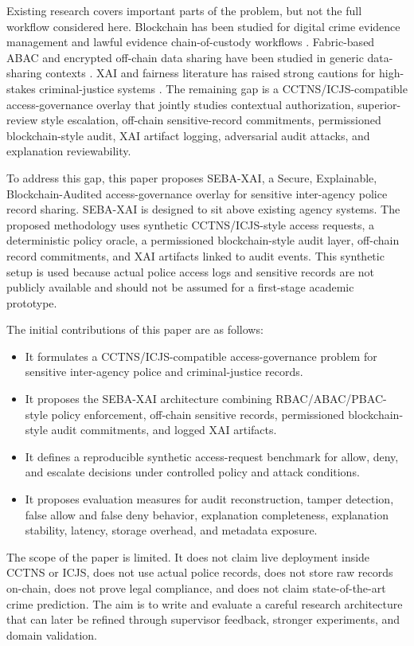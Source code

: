 Existing research covers important parts of the problem, but not the full workflow considered here. Blockchain has been studied for digital crime evidence management and lawful evidence chain-of-custody workflows \cite{kim_two_level_2021,li_lechain_2021}. Fabric-based ABAC and encrypted off-chain data sharing have been studied in generic data-sharing contexts \cite{zhao_fabric_abac_2022}. XAI and fairness literature has raised strong cautions for high-stakes criminal-justice systems \cite{rudin_2019,ensign_feedback_2018,zocholl_xai_law_enforcement_2025}. The remaining gap is a CCTNS/ICJS-compatible access-governance overlay that jointly studies contextual authorization, superior-review style escalation, off-chain sensitive-record commitments, permissioned blockchain-style audit, XAI artifact logging, adversarial audit attacks, and explanation reviewability.

To address this gap, this paper proposes SEBA-XAI, a Secure, Explainable, Blockchain-Audited access-governance overlay for sensitive inter-agency police record sharing. SEBA-XAI is designed to sit above existing agency systems. The proposed methodology uses synthetic CCTNS/ICJS-style access requests, a deterministic policy oracle, a permissioned blockchain-style audit layer, off-chain record commitments, and XAI artifacts linked to audit events. This synthetic setup is used because actual police access logs and sensitive records are not publicly available and should not be assumed for a first-stage academic prototype.

The initial contributions of this paper are as follows:
\begin{itemize}
    \item It formulates a CCTNS/ICJS-compatible access-governance problem for sensitive inter-agency police and criminal-justice records.
    \item It proposes the SEBA-XAI architecture combining RBAC/ABAC/PBAC-style policy enforcement, off-chain sensitive records, permissioned blockchain-style audit commitments, and logged XAI artifacts.
    \item It defines a reproducible synthetic access-request benchmark for allow, deny, and escalate decisions under controlled policy and attack conditions.
    \item It proposes evaluation measures for audit reconstruction, tamper detection, false allow and false deny behavior, explanation completeness, explanation stability, latency, storage overhead, and metadata exposure.
\end{itemize}

The scope of the paper is limited. It does not claim live deployment inside CCTNS or ICJS, does not use actual police records, does not store raw records on-chain, does not prove legal compliance, and does not claim state-of-the-art crime prediction. The aim is to write and evaluate a careful research architecture that can later be refined through supervisor feedback, stronger experiments, and domain validation.
